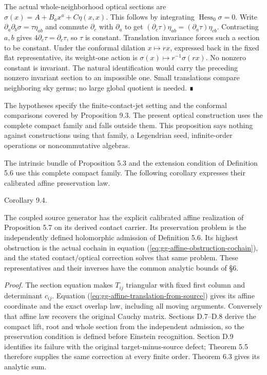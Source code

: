 \documentclass[
  english,
  11pt,
  reqno]{amsart}
\makeatletter
\newcommand{\pandocstatementheading}[1]{%
  \par\addpenalty{\@beginparpenalty}%
  \addvspace{.5\baselineskip plus .2\baselineskip minus .2\baselineskip}%
  {\normalfont\bfseries #1\par}%
  \nobreak\@afterindenttrue\@afterheading
}
\makeatother
\begin{document}
The actual whole-neighborhood optical sections are
\(\sigma(x)=A+B_ax^a+C\eta(x,x)\). This follows by integrating
\(\operatorname{Hess}_0\sigma=0\). Write
\(\partial_a\partial_b\sigma=\tau\eta_{ab}\) and commute \(\partial_c\)
with \(\partial_a\) to get
\((\partial_c\tau)\eta_{ab}=(\partial_a\tau)\eta_{cb}\). Contracting
\(a,b\) gives \(4\partial_c\tau=\partial_c\tau\), so \(\tau\) is
constant. Translation invariance forces such a section to be constant.
Under the conformal dilation \(x\mapsto rx\), expressed back in the
fixed flat representative, its weight-one action is
\(\sigma(x)\mapsto r^{-1}\sigma(rx)\). No nonzero constant is invariant.
The natural identification would carry the preceding nonzero invariant
section to an impossible one. Small translations compare neighboring sky
germs; no large global quotient is needed. ∎

The hypotheses specify the finite-contact-jet setting and the conformal
comparisons covered by Proposition 9.3. The present optical construction
uses the complete compact family and falls outside them. This
proposition says nothing against constructions using that family, a
Legendrian seed, infinite-order operations or noncommutative algebras.

The intrinsic bundle of Proposition 5.3 and the extension condition of
Definition 5.6 use this complete compact family. The following corollary
expresses their calibrated affine preservation law.

\pandocstatementheading{\protect{}\label{prob:gg-intrinsic-active-realization}

\protect\phantomsection\label{cor:gg-active-affine-realization}Corollary 9.4.}

The coupled source generator has the explicit calibrated affine
realization of Proposition 5.7 on its derived contact carrier. Its
preservation problem is the independently defined holomorphic admission
of Definition 5.6. Its highest obstruction is the actual cochain in
equation (\ref{eq:gg-affine-obstruction-cochain}), and the stated
contact/optical correction solves that same problem. These
representatives and their inverses have the common analytic bounds of
§6.

\emph{Proof.} The section equation makes \(T_{ij}\) triangular with
fixed first column and determinant \(c_{ij}\). Equation
(\ref{eq:gg-affine-translation-from-source}) gives its affine coordinate
and the exact overlap law, including all moving arguments. Conversely
that affine law recovers the original Cauchy matrix. Sections D.7--D.8
derive the compact lift, root and whole section from the independent
admission, so the preservation condition is defined before Einstein
recognition. Section D.9 identifies its failure with the original
target-minus-source defect; Theorem 5.5 therefore supplies the same
correction at every finite order. Theorem 6.3 gives its analytic sum.
\end{document}
